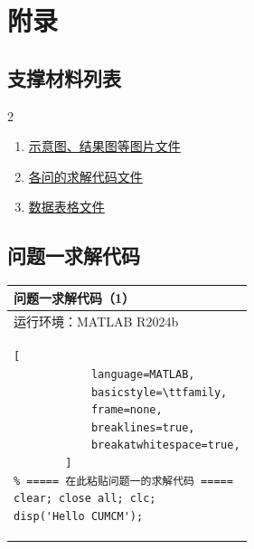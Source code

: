 \documentclass[a4paper,12pt]{article}
\begin{document}
\clearpage

\section*{附录}

\subsection*{支撑材料列表}
\begin{multicols}{2}
\begin{enumerate}
    \item \underline{示意图、结果图等图片文件}
    \item \underline{各问的求解代码文件}
    \item \underline{数据表格文件}
\end{enumerate}
\end{multicols}

\clearpage

\subsection*{问题一求解代码}

\begin{table}[H]
    \centering
    \setlength{\heavyrulewidth}{1.5pt}
    \setlength{\lightrulewidth}{1pt}
    \renewcommand{\arraystretch}{1.2}
    \begin{tabular}{>{\centering\arraybackslash}p{}}
        \toprule[1.5pt]
        \textbf{问题一求解代码（1）} \\
        \midrule[1pt]
        运行环境：MATLAB R2024b \\
        \midrule[1pt]
        \begin{lstlisting}[
            language=MATLAB,
            basicstyle=\ttfamily,
            frame=none,
            breaklines=true,
            breakatwhitespace=true,
        ]
% ===== 在此粘贴问题一的求解代码 =====
clear; close all; clc;
disp('Hello CUMCM');
        \end{lstlisting} \\
        \bottomrule[1.5pt]
    \end{tabular}
\end{table}

\end{document}
